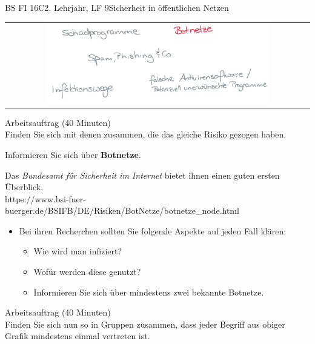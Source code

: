 \documentclass[oneside,openany,headings=optiontotoc,11pt,numbers=noenddot]{scrreprt}
\begin{document}
\begin{worksheet}{BS FI 16C}{2. Lehrjahr, LF 9}{Sicherheit in öffentlichen Netzen}
		\newpage
		\setcounter{page}{1}
		\begin{framed}
			\begin{tabular}{lcr}
				& \includegraphics[width=0.8\textwidth]{Bilder/Botnetze.jpg} & \\
			\end{tabular}
		\end{framed}
		\color{codegray}Arbeitsauftrag (40 Minuten)\\
		\color{black}
		Finden Sie sich mit denen zusammen, die das gleiche Risiko gezogen haben.
		\par
		\bigskip
		\noindent
		Informieren Sie sich über \textbf{Botnetze}.
		\par
		\bigskip
		\noindent
		Das \textit{Bundesamt für Sicherheit im Internet} bietet ihnen einen guten ersten Überblick.\\
		\small{\color{codegray}https://www.bsi-fuer-buerger.de/BSIFB/DE/Risiken/BotNetze/botnetze\_node.html}
		\normalsize
		\begin{itemize}
			\item[] Bei ihren Recherchen sollten Sie folgende Aspekte auf jeden Fall klären:
			\begin{itemize}
				\item Wie wird man infiziert?
				\item Wofür werden diese genutzt?
				\item Informieren Sie sich über mindestens zwei bekannte Botnetze.
			\end{itemize}
		\end{itemize}
		\par
		\bigskip
		\noindent
		
		\color{codegray}Arbeitsauftrag (40 Minuten)\\
		\color{black}
		Finden Sie sich nun so in Gruppen zusammen, dass jeder Begriff aus obiger Grafik mindestens einmal vertreten ist.
	

\end{worksheet}
\end{document}
